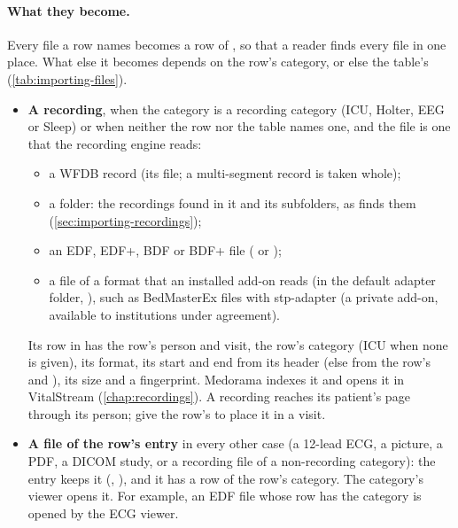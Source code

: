 \paragraph{What they become.} Every file a row names becomes a row of , so that a
reader finds every file in one place. What else it becomes depends on the row's category, or else
the table's (\cref{tab:importing-files}).
\begin{itemize}
\item \textbf{A recording}, when the category is a recording category (ICU, Holter, EEG or
  Sleep) or when neither the row nor the table names one, and the file is one that the recording
  engine reads:
  \begin{itemize}
  \item a WFDB record (its  file; a multi-segment record is taken whole);
  \item a folder: the recordings found in it and its subfolders, as 
    finds them (\cref{sec:importing-recordings});
  \item an EDF, EDF+, BDF or BDF+ file ( or );
  \item a file of a format that an installed add-on reads (in the default adapter folder,
    ), such as BedMasterEx  files
    with stp-adapter (a private add-on, available to institutions under agreement).
  \end{itemize}
  Its row in  has the row's person and visit, the row's category (ICU when none
  is given), its format, its start and end from its header (else from the row's  and
  ), its size and a fingerprint. Medorama indexes it and opens it in VitalStream
  (\cref{chap:recordings}). A recording reaches its patient's page through its person; give the
  row's  to place it in a visit.
\item \textbf{A file of the row's entry} in every other case (a 12-lead ECG, a picture, a PDF, a
  DICOM study, or a recording file of a non-recording category): the entry keeps it
  (, ), and it has a  row of the row's category. The
  category's viewer opens it. For example, an EDF file whose row has the category  is
  opened by the ECG viewer.
\end{itemize}

